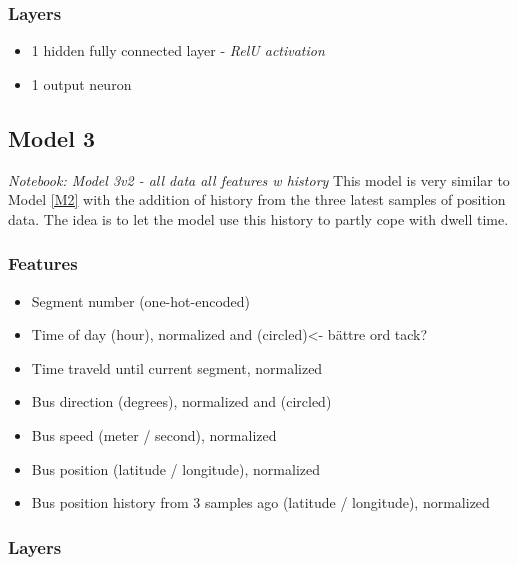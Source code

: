 
\subsubsection{Layers}

\begin{itemize}
    \item 1 hidden fully connected layer - \textit{RelU activation}
    \item 1 output neuron
\end{itemize}


\subsection{Model 3}\label{M3}
\textit{Notebook: Model 3v2 - all data all features w history}
\noindent This model is very similar to Model \ref{M2} with the addition of history from the three latest samples of position data. The idea is to let the model use this history to partly cope with dwell time.

\subsubsection{Features}

\begin{itemize}
    \item Segment number (one-hot-encoded)
    \item Time of day (hour), normalized and (circled)<- bättre ord tack?
    \item Time traveld until current segment, normalized
    \item Bus direction (degrees), normalized and (circled)
    \item Bus speed (meter / second), normalized
    \item Bus position (latitude / longitude), normalized
    \item Bus position history from 3 samples ago (latitude / longitude), normalized
\end{itemize}

\subsubsection{Layers}

